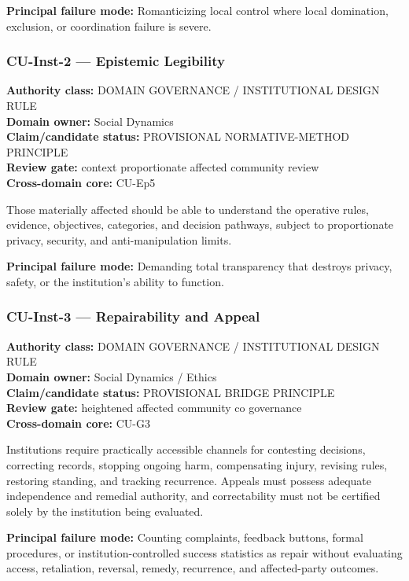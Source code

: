 \documentclass[
  11pt,
]{article}
\begin{document}
\textbf{Principal failure mode:} Romanticizing local control where local
domination, exclusion, or coordination failure is severe.

\subsubsection{CU-Inst-2 --- Epistemic
Legibility}\label{cu-inst-2-epistemic-legibility}

\textbf{Authority class:} DOMAIN GOVERNANCE / INSTITUTIONAL DESIGN
RULE\\
\textbf{Domain owner:} Social Dynamics\\
\textbf{Claim/candidate status:} PROVISIONAL NORMATIVE-METHOD
PRINCIPLE\\
\textbf{Review gate:} context proportionate affected community review\\
\textbf{Cross-domain core:} CU-Ep5

Those materially affected should be able to understand the operative
rules, evidence, objectives, categories, and decision pathways, subject
to proportionate privacy, security, and anti-manipulation limits.

\textbf{Principal failure mode:} Demanding total transparency that
destroys privacy, safety, or the institution's ability to function.

\subsubsection{CU-Inst-3 --- Repairability and
Appeal}\label{cu-inst-3-repairability-and-appeal}

\textbf{Authority class:} DOMAIN GOVERNANCE / INSTITUTIONAL DESIGN
RULE\\
\textbf{Domain owner:} Social Dynamics / Ethics\\
\textbf{Claim/candidate status:} PROVISIONAL BRIDGE PRINCIPLE\\
\textbf{Review gate:} heightened affected community co governance\\
\textbf{Cross-domain core:} CU-G3

Institutions require practically accessible channels for contesting
decisions, correcting records, stopping ongoing harm, compensating
injury, revising rules, restoring standing, and tracking recurrence.
Appeals must possess adequate independence and remedial authority, and
correctability must not be certified solely by the institution being
evaluated.

\textbf{Principal failure mode:} Counting complaints, feedback buttons,
formal procedures, or institution-controlled success statistics as
repair without evaluating access, retaliation, reversal, remedy,
recurrence, and affected-party outcomes.
\end{document}
